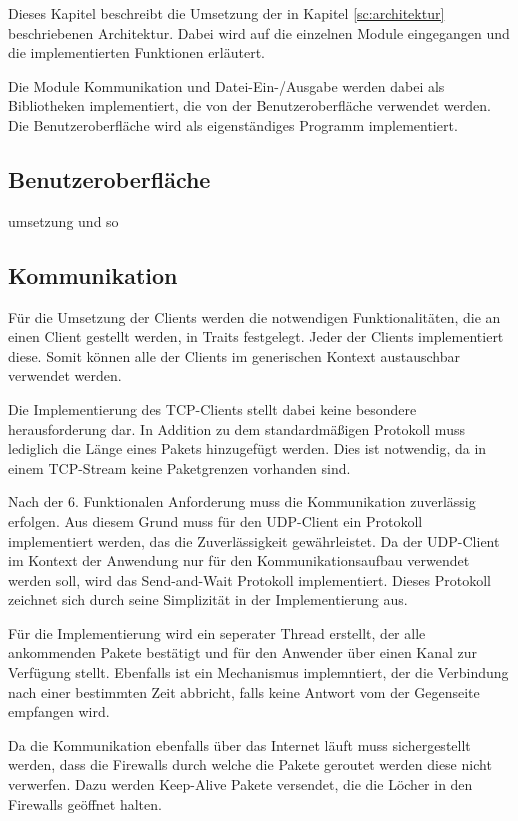 Dieses Kapitel beschreibt die Umsetzung der in Kapitel \ref{sc:architektur} beschriebenen Architektur. Dabei wird auf die einzelnen Module eingegangen und die implementierten Funktionen erläutert. 

Die Module Kommunikation und Datei-Ein-/Ausgabe werden dabei als Bibliotheken implementiert, die von der Benutzeroberfläche verwendet werden. Die Benutzeroberfläche wird als eigenständiges Programm implementiert.

\subsection{Benutzeroberfläche}
umsetzung und so

\subsection{Kommunikation}
Für die Umsetzung der Clients werden die notwendigen Funktionalitäten, die an einen Client gestellt werden, in Traits festgelegt. Jeder der Clients implementiert diese. Somit können alle der Clients im generischen Kontext austauschbar verwendet werden.

Die Implementierung des TCP-Clients stellt dabei keine besondere herausforderung dar. In Addition zu dem standardmäßigen Protokoll muss lediglich die Länge eines Pakets hinzugefügt werden. Dies ist notwendig, da in einem TCP-Stream keine Paketgrenzen vorhanden sind.

Nach der 6. Funktionalen Anforderung muss die Kommunikation zuverlässig erfolgen. Aus diesem Grund muss für den UDP-Client ein Protokoll implementiert werden, das die Zuverlässigkeit gewährleistet. Da der UDP-Client im Kontext der Anwendung nur für den Kommunikationsaufbau verwendet werden soll, wird das Send-and-Wait Protokoll implementiert. Dieses Protokoll zeichnet sich durch seine Simplizität in der Implementierung aus. \cite[195]{ethz-vernetzte-systeme}

Für die Implementierung wird ein seperater Thread erstellt, der alle ankommenden Pakete bestätigt und für den Anwender über einen Kanal zur Verfügung stellt. Ebenfalls ist ein Mechanismus implemntiert, der die Verbindung nach einer bestimmten Zeit abbricht, falls keine Antwort vom der Gegenseite empfangen wird.

Da die Kommunikation ebenfalls über das Internet läuft muss sichergestellt werden, dass die Firewalls durch welche die Pakete geroutet werden diese nicht verwerfen. Dazu werden Keep-Alive Pakete versendet, die die Löcher in den Firewalls geöffnet halten. \cite{enginner-man-udp}

